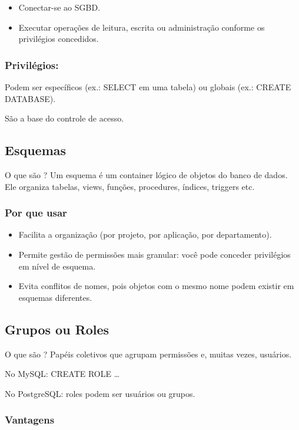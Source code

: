\documentclass[
]{book}
\begin{document}
\begin{itemize}
\item
  Conectar-se ao SGBD.
\item
  Executar operações de leitura, escrita ou administração conforme os privilégios concedidos.
\end{itemize}

\subsubsection{Privilégios:}\label{priviluxe9gios}

Podem ser específicos (ex.: SELECT em uma tabela) ou globais (ex.: CREATE DATABASE).

São a base do controle de acesso.

\subsection{Esquemas}\label{esquemas}

O que são ? Um esquema é um container lógico de objetos do banco de dados. Ele organiza tabelas, views, funções, procedures, índices, triggers etc.

\subsubsection{Por que usar}\label{por-que-usar}

\begin{itemize}
\item
  Facilita a organização (por projeto, por aplicação, por departamento).
\item
  Permite gestão de permissões mais granular: você pode conceder privilégios em nível de esquema.
\item
  Evita conflitos de nomes, pois objetos com o mesmo nome podem existir em esquemas diferentes.
\end{itemize}

\subsection{Grupos ou Roles}\label{grupos-ou-roles}

O que são ? Papéis coletivos que agrupam permissões e, muitas vezes, usuários.

No MySQL: CREATE ROLE \ldots{}

No PostgreSQL: roles podem ser usuários ou grupos.

\subsubsection{Vantagens}\label{vantagens}
\end{document}
